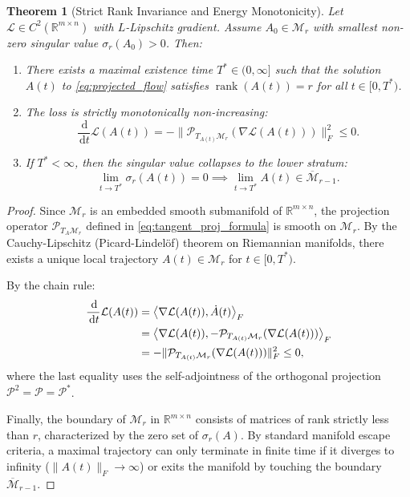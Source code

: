\documentclass[11pt,a4paper,reqno]{amsart}
\newtheorem{theorem}{Theorem}[section]
\theoremstyle{definition}
\numberwithin{equation}{section}
\providecommand{\R}{\mathbb{R}}
\newcommand{\rank}{\operatorname{rank}}
\newcommand{\inner}[2]{\left\langle #1, #2 \right\rangle}
\newcommand{\dif}{\,\mathrm{d}}
\providecommand{\R}{\mathbb{R}}
\begin{document}
\begin{theorem}[Strict Rank Invariance and Energy Monotonicity]
\label{thm:rank_preservation}
Let $\mathcal{L} \in C^2(\R^{m \times n})$ with $L$-Lipschitz gradient. Assume $A_0 \in \mathcal{M}_r$ with smallest non-zero singular value $\sigma_r(A_0) > 0$. Then:
\begin{enumerate}[label=(\roman*)]
    \item There exists a maximal existence time $T^* \in (0, \infty]$ such that the solution $A(t)$ to \eqref{eq:projected_flow} satisfies $\rank(A(t)) = r$ for all $t \in [0, T^*)$.
    \item The loss is strictly monotonically non-increasing:
    \begin{equation}
        \frac{\dif}{\dif t} \mathcal{L}(A(t)) = -\|\mathcal{P}_{T_{A(t)} \mathcal{M}_r}(\nabla \mathcal{L}(A(t)))\|_F^2 \le 0.
    \end{equation}
    \item If $T^* < \infty$, then the singular value collapses to the lower stratum:
    \begin{equation}
        \lim_{t \to T^*} \sigma_r(A(t)) = 0 \implies \lim_{t \to T^*} A(t) \in \overline{\mathcal{M}}_{r-1}.
    \end{equation}
\end{enumerate}
\end{theorem}
\begin{proof}
Since $\mathcal{M}_r$ is an embedded smooth submanifold of $\R^{m \times n}$, the projection operator $\mathcal{P}_{T_A \mathcal{M}_r}$ defined in \eqref{eq:tangent_proj_formula} is smooth on $\mathcal{M}_r$. By the Cauchy-Lipschitz (Picard-Lindel\"of) theorem on Riemannian manifolds, there exists a unique local trajectory $A(t) \in \mathcal{M}_r$ for $t \in [0, T^*)$.

By the chain rule:
\begin{align}
    \frac{\dif}{\dif t} \mathcal{L}(A(t)) &= \inner{\nabla \mathcal{L}(A(t))}{\dot{A}(t)}_F \notag \\
    &= \inner{\nabla \mathcal{L}(A(t))}{-\mathcal{P}_{T_{A(t)} \mathcal{M}_r}(\nabla \mathcal{L}(A(t)))}_F \notag \\
    &= -\|\mathcal{P}_{T_{A(t)} \mathcal{M}_r}(\nabla \mathcal{L}(A(t)))\|_F^2 \le 0,
\end{align}
where the last equality uses the self-adjointness of the orthogonal projection $\mathcal{P}^2 = \mathcal{P} = \mathcal{P}^*$.

Finally, the boundary of $\mathcal{M}_r$ in $\R^{m \times n}$ consists of matrices of rank strictly less than $r$, characterized by the zero set of $\sigma_r(A)$. By standard manifold escape criteria, a maximal trajectory can only terminate in finite time if it diverges to infinity ($\|A(t)\|_F \to \infty$) or exits the manifold by touching the boundary $\overline{\mathcal{M}}_{r-1}$.
\end{proof}
\end{document}
